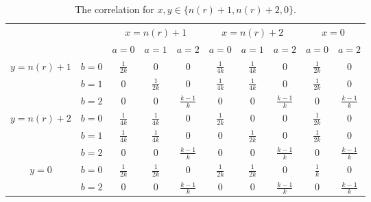 \documentclass[11pt,letterpaper]{article}
\newcommand{\1}{\mathbb{1}}
\newcommand{\nr}{n(r)}
\theoremstyle{definition}
\begin{document}
\begin{table}[H]
\begin{center}
\begin{tabular}{|c|c||c|c|c|c|c|c|c|c|}
\hline
\multicolumn{2}{|c|}{} &
\multicolumn{3}{|c|}{$x=\nr+1$}&
\multicolumn{3}{|c|}{$x=\nr+2$}&
\multicolumn{2}{|c|}{$x=0$}\\
\cline{3-10}
\multicolumn{2}{|c|}{} &
$a = 0$ & $a=1$ & $a=2$ &
$a = 0$ & $a=1$ & $a=2$ &
$a = 0$ & $a =2 $\\
\hline
\hline
\multirow{3}{*}{$y = \nr+1$} & $b=0$ & $\frac{1}{2k}$ & $0$ & 0 
& $\frac{1}{4k}$ & $\frac{1}{4k}$ & 0 & $\frac{1}{2k}$ & 0 \\
\cline{2-10}
&$b=1$ & 0 & $\frac{1}{2k}$ & $0$ 
&  $\frac{1}{4k}$ & $\frac{1}{4k}$ & 0 &$\frac{1}{2k}$ & 0 \\
\cline{2-10}
&$b=2$ & 0 & 0 & $\frac{k-1}{k}$ 
&  0 & 0 &  $\frac{k-1}{k} $ &0 & $\frac{k-1}{k}$ \\
\hline
\multirow{3}{*}{$y = \nr+2$} & $b=0$ & $\frac{1}{4k}$ & $\frac{1}{4k}$ & 0 
& $\frac{1}{2k}$ & $0$ & 0 & $\frac{1}{2k}$ & 0 \\
\cline{2-10}
&$b=1$ & $\frac{1}{4k}$ & $\frac{1}{4k}$ & $0$ 
&  0 & $\frac{1}{2k}$ & $0$ &$\frac{1}{2k}$ & 0 \\
\cline{2-10}
&$b=2$ & 0 & 0 & \small $\frac{k-1}{k}$ 
&  0 & 0 & \small $\frac{k-1}{k} $ &0 &\small $\frac{k-1}{k}$ \\
\hline
\multirow{2}{*}{$y = 0$} & $b=0$ & $\frac{1}{2k}$ & $\frac{1}{2k}$ & 0 
& $\frac{1}{2k}$ & $\frac{1}{2k}$ & 0 & $\frac{1}{k}$ & 0 \\
\cline{2-10}
&$b=2$ & 0 & 0 & $\frac{k-1}{k}$ 
&  0 & 0 & \small $\frac{k-1}{k} $ &0 & \small $\frac{k-1}{k}$ \\
\hline
\end{tabular}
\end{center}
\caption{The correlation for $x ,y\in\{\nr+1,\nr+2, 0\} $.}
\end{table}
\end{document}
